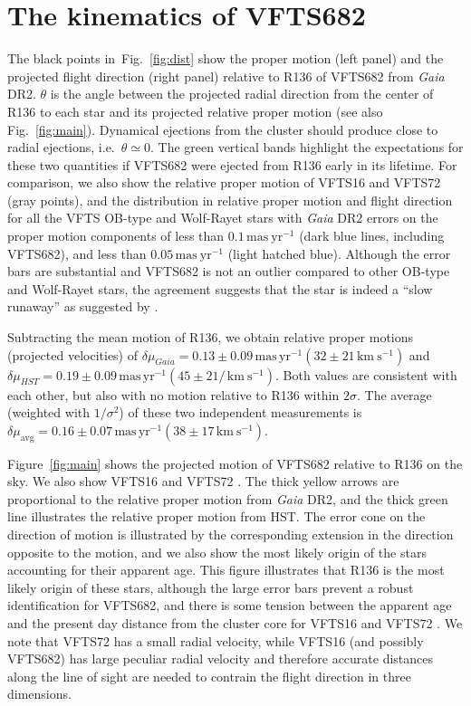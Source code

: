 \documentclass[a4paper,fleqn,usenatbib]{mnras}
\newcommand{\kms}{{\,\mathrm{km\ s^{-1}}}}
\newcommand{\masyr}{\,\mathrm{mas}\,\mathrm{yr}^{-1}}
\DeclareRobustCommand{\Figref}[1]{Fig.~\ref{#1}}
\DeclareRobustCommand{\Tabref}[1]{Table~\ref{#1}}
\begin{document}
\vspace*{-20pt}
\section{The kinematics of VFTS682}
\label{sec:results}

The black points in~\Figref{fig:dist} show the proper motion 
(left panel) and the projected flight direction (right panel) relative
to R136 of
VFTS682 from \emph{Gaia} DR2. $\theta$ is the angle between the projected radial direction from the
center of R136 to each star and its projected relative proper motion
(see also \Figref{fig:main}). Dynamical ejections from the
cluster should %
produce close to radial ejections, i.e.~$\theta\simeq0$. The green
vertical bands highlight the expectations for these two quantities if VFTS682 were ejected from R136 early in its
lifetime. For comparison, we also show the relative
proper motion of VFTS16 and VFTS72 (gray points), and the distribution
in relative proper motion and flight direction for all the VFTS OB-type and Wolf-Rayet stars with
\emph{Gaia} DR2 errors on the proper motion
components of less than $0.1\,\mathrm{mas\ yr^{-1}}$ (dark blue lines,
including VFTS682), and less than $0.05\,\mathrm{mas\ yr^{-1}}$ (light hatched
blue). Although the error bars are substantial and VFTS682 is not
an outlier compared to other OB-type and Wolf-Rayet stars, the agreement
suggests that the star is indeed a ``slow runaway'' as suggested by
\cite{bestenlehner:11}. 

Subtracting
the mean motion of R136, we obtain relative proper motions (projected
velocities) of $\delta \mu_{Gaia}=0.13\pm 0.09\masyr (32\pm 21\kms)$ and
$\delta \mu_{HST}=0.19\pm 0.09\masyr (45 \pm 21/\kms )$. Both values
are consistent with each other, but also with no motion relative to R136
within $2\sigma$. The average (weighted with $1/\sigma^2$) of these two independent
measurements is $\delta \mu_\mathrm{avg}=0.16\pm0.07\masyr
(38\pm17\kms)$. 

Figure~\ref{fig:main} shows the projected motion of VFTS682 relative to R136 on the
sky. We also show VFTS16 and VFTS72 %
\citep[see][]{lennon:18}. The thick yellow arrows are proportional to
the relative proper motion from \emph{Gaia} DR2, and the thick green
line illustrates the relative proper motion from HST. The error cone
on the direction of motion is illustrated by the corresponding
extension in the direction opposite to the motion, and we also show
the most likely origin of the stars accounting for their apparent age.
This figure illustrates that R136 is the most likely origin of these stars, although the large error bars
prevent a robust identification for VFTS682, and there is some tension
between the apparent age and the present day distance from the cluster
core for VFTS16 and VFTS72 \citep[][]{lennon:18}. We note that
VFTS72 has a small radial velocity, while VFTS16 (and possibly VFTS682) has
large peculiar radial velocity and therefore accurate distances along
the line of sight are
needed to contrain the flight direction in three dimensions.
\end{document}
